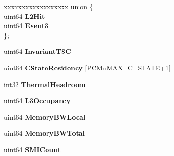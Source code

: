 \begin{DoxyCompactItemize}
\begin{tabbing}
\end{tabbing}\item 
\mbox{\label{class_basic_counter_state_a8ad8f0451a153180e8e08ceb4c665ba2}} 
\begin{tabbing}
xx\=xx\=xx\=xx\=xx\=xx\=xx\=xx\=xx\=\kill
union \{\\
\>uint64 {\bfseries L2Hit}\\
\>uint64 {\bfseries Event3}\\
\}; \\

\end{tabbing}\item 
\mbox{\label{class_basic_counter_state_af357162e5b43c6dfc0ce92fd56fa30a0}} 
uint64 {\bfseries Invariant\+T\+SC}
\item 
\mbox{\label{class_basic_counter_state_af9069c972052bac5ed648e519e03da9c}} 
uint64 {\bfseries C\+State\+Residency} \mbox{[}P\+C\+M\+::\+M\+A\+X\+\_\+\+C\+\_\+\+S\+T\+A\+TE+1\mbox{]}
\item 
\mbox{\label{class_basic_counter_state_a4950fe3761b2ac599a7ae64ec7bee973}} 
int32 {\bfseries Thermal\+Headroom}
\item 
\mbox{\label{class_basic_counter_state_a99dab23e20418b86be72dda1ecd8858c}} 
uint64 {\bfseries L3\+Occupancy}
\item 
\mbox{\label{class_basic_counter_state_a115320ce0518d55acd0db90c127419b8}} 
uint64 {\bfseries Memory\+B\+W\+Local}
\item 
\mbox{\label{class_basic_counter_state_a97a5bc9ad3dc45a876a34740537e54a8}} 
uint64 {\bfseries Memory\+B\+W\+Total}
\item 
\mbox{\label{class_basic_counter_state_a1776fe74136c0e204c68885f23989828}} 
uint64 {\bfseries S\+M\+I\+Count}
\end{DoxyCompactItemize}
